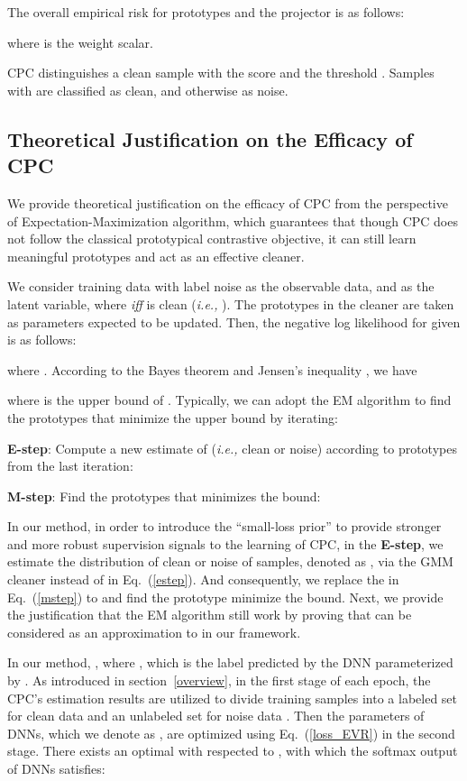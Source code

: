 \documentclass{article} \usepackage{iclr2023_conference,times}
\begin{document}
The overall empirical risk  for prototypes and the projector is as follows:

where  is the weight scalar.

 CPC distinguishes a clean sample  with the score  and the threshold . Samples with  are classified as clean, and otherwise as noise.



\subsection{Theoretical Justification on the Efficacy of CPC} \label{sec:em}
We provide theoretical justification on the efficacy of CPC from the perspective of Expectation-Maximization algorithm, which guarantees that though CPC does not follow the classical prototypical contrastive objective, it can  still learn meaningful prototypes and act as an effective cleaner. 

We consider training data with label noise  as the observable data, and  as the latent variable, where  \emph{iff}  is clean (\emph{i.e.,} ). The prototypes  in the cleaner are taken as parameters expected to be updated. Then, the negative log likelihood for  given  is as follows:

where . According to the Bayes theorem and Jensen's inequality , we have

where  is the upper bound of . Typically, we can adopt the EM algorithm to find the prototypes  that minimize the upper bound by iterating:

\textbf{E-step}: Compute a new estimate of  (\emph{i.e.,} clean or noise) according to prototypes  from the last iteration:
    
\textbf{M-step}: Find the prototypes  that minimizes the bound:
    
In our method, in order to introduce the ``small-loss prior'' to provide stronger and more robust supervision signals to the learning of CPC, in the \textbf{E-step}, we estimate the distribution of clean or noise of samples, denoted as , via the GMM cleaner instead of  in Eq.~(\ref{estep}). And consequently, we replace the  in  Eq.~(\ref{mstep}) to  and find the prototype  minimize the bound. Next, we provide the justification that the EM algorithm still work by proving that  can be considered as an approximation to  in our framework.



In our method, , where , 
which is the label predicted by the DNN parameterized by .
As introduced in section~\ref{overview}, in the first stage of each epoch, the CPC's estimation results  are utilized to divide training samples into a labeled set for clean  data  and an unlabeled set for noise data .
Then the parameters of DNNs, which we denote as , are optimized using Eq.~(\ref{loss_EVR}) in the second stage.
There exists an optimal  with respected to , with which the softmax output  of DNNs satisfies:
\end{document}
